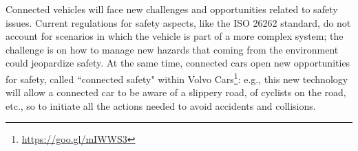Connected vehicles will face new challenges and opportunities related to safety issues.
Current %
regulations for safety aspects, like the ISO 26262 standard, do not account for scenarios in which the %
vehicle is part of a more complex system; the challenge is on how to manage new hazards that coming from the environment could jeopardize safety. 
At the same time, connected cars open new opportunities for safety, called ``connected safety" within Volvo Cars\footnote{\url{https://goo.gl/mIWWS3}}: %
e.g., this new technology will allow a connected car to be aware of a slippery road, of cyclists on the road, etc., so to initiate all the actions needed to avoid accidents and collisions. 
%

